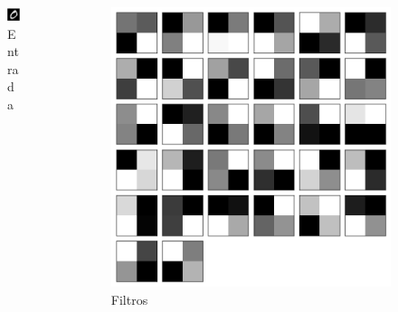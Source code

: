 \documentclass[tikz,10pt]{beamer}
\begin{document}
\begin{frame}
\begin{columns}
		\begin{column}{0.25\textwidth}
			\begin{figure}
				\includegraphics[height=.1\paperheight]{images/fabio/num_0}
				\caption{Entrada}
			\end{figure}%
		\end{column}
		\begin{column}{0.5\textwidth}
			\begin{figure}
			\includegraphics[height=.6\paperheight]{images/resultados/network_1/filter_convolution2d_1}%
			\caption{Filtros}			
			\end{figure}%
		\end{column}	
	\end{columns}

\end{frame}
\end{document}
